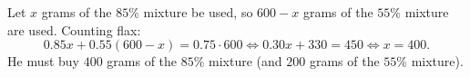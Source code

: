 Let $x$ grams of the $85\%$ mixture be used, so $600-x$ grams of the $55\%$ mixture are used. Counting flax:
\[
0.85x+0.55(600-x)=0.75\cdot600\iff 0.30x+330=450\iff x=400 .
\]
He must buy $\boxed{400}$ grams of the $85\%$ mixture (and $200$ grams of the $55\%$ mixture).
